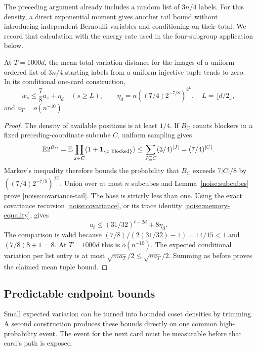 The preceding argument already includes a random list of $3n/4$ labels.
For this density, a direct exponential moment gives another tail bound
without introducing independent Bernoulli variables and conditioning on
their total. We record that calculation with the energy rate used in the
four-subgroup application below.

\begin{proposition}
\label{noise:covariance-marginal}
At $T=1000d$, the mean total-variation distance for the images of a
uniform ordered list of $3n/4$ starting labels from a uniform injective
tuple tends to zero. In its conditional one-card construction,
\begin{equation}
 w_s\le\frac78a_s+\eta_d\quad(s\ge L),\qquad
 \eta_d=n\left((7/4)2^{-7/8}\right)^{2^L},\quad
 L=\lfloor d/2\rfloor,
 \label{noise:covariance-tail}
\end{equation}
and $a_T=o(n^{-10})$.
\end{proposition}

\begin{proof}
The density of available positions is at least $1/4$. If $B_C$ counts blockers in a
fixed preceding-coordinate subcube $C$, uniform sampling gives
\[
 \mathbb E 2^{B_C}
 =\mathbb E\prod_{x\in C}(1+\mathbf 1_{\{x\text{ blocked}\}})
 \le\sum_{J\subseteq C}(3/4)^{|J|}=(7/4)^{|C|}.
\]
Markov's inequality therefore bounds the probability that $B_C$
exceeds $7|C|/8$ by $((7/4)2^{-7/8})^{|C|}$. Union over at most
$n$ subcubes and Lemma~\ref{noise:subcubes} prove
\eqref{noise:covariance-tail}. The base is strictly less than one.
Using the exact covariance recursion \eqref{noise:covariance}, or its
trace identity \eqref{noise:memory-equality}, gives
\[
 a_t\le(31/32)^{t-2d}+8\eta_d.
\]
The comparison is valid because $(7/8)/(2(31/32)-1)=14/15<1$
and $(7/8)8+1=8$. At $T=1000d$ this is $o(n^{-10})$.
The expected conditional variation per list entry is at most
$\sqrt{ma_T}/2\le\sqrt{na_T}/2$. Summing as before proves the
claimed mean tuple bound.
\end{proof}

\subsection{Predictable endpoint bounds}

Small expected variation can be turned into bounded coset densities by
trimming. A second construction produces these bounds directly on one
common high-probability event. The event for the next card must be
measurable before that card's path is exposed.

